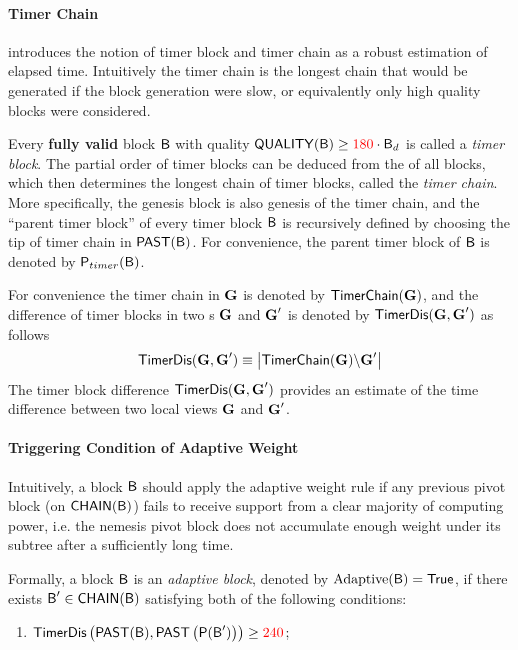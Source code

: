 {	\paragraph{Timer Chain}
	\label{sec:timer chain}

	\name introduces the notion of timer block and timer chain as a robust estimation of elapsed time.
	Intuitively the timer chain is the longest chain that would be generated if the block generation were slow, or equivalently only high quality blocks were considered.

	Every \textbf{fully valid} block $\textsf{B}$ with quality $\mathsf{QUALITY}(\textsf{B})\ge {\color{red}180}\cdot \textsf{B}_d$ is called a \emph{timer block}.
	The partial order of timer blocks can be deduced from the \tg of all blocks,
	which then determines the longest chain of timer blocks, called the \emph{timer chain}.	
	More specifically, the genesis block is also genesis of the timer chain, and the ``parent timer block'' of every timer block $\textsf{B}$ is recursively defined by choosing the tip of timer chain in $\mathsf{PAST}(\textsf{B})$. 
	For convenience, the parent timer block of $\textsf{B}$ is denoted by $\mathsf{P}_{timer}(\textsf{B})$.

	For convenience the timer chain in \tg $\textbf{G}$ is denoted by $\mathsf{TimerChain}(\textbf{G})$,
	and the difference of timer blocks in two {\tg}s $\textbf{G}$ and $\textbf{G}'$ is denoted by $\mathsf{TimerDis}(\textbf{G},\textbf{G}')$ as follows
	\begin{align}\label{def:timerdis}
		\mathsf{TimerDis}(\textbf{G},\textbf{G}') \equiv \left|\mathsf{TimerChain}(\textbf{G}) 
		\backslash  \textbf{G}' \right|
	\end{align}
	The timer block difference $\mathsf{TimerDis}(\textbf{G},\textbf{G}')$ provides an estimate of the time difference between two local views $\textbf{G}$ and $\textbf{G}'$.




	\paragraph{Triggering Condition of Adaptive Weight}
		

	Intuitively, a block $\textsf{B}$ should apply the adaptive weight rule if any previous pivot block (on $\mathsf{CHAIN}(\textsf{B})$) fails to 
	receive support from a clear majority of computing power,
	i.e. the nemesis pivot block does not accumulate enough weight under its subtree after a sufficiently long time.
	
	Formally, 
	a block $\textsf{B}$ is an \emph{adaptive block}, denoted by $\mathrm{Adaptive}(\textsf{B})=\mathsf{True}$,
	if there exists $\textsf{B}'\in\mathsf{CHAIN}(\textsf{B})$ satisfying both of the following conditions:
	\begin{enumerate}[]
		\item $\mathsf{TimerDis}\left(\mathsf{PAST}(\textsf{B}),\mathsf{PAST}\left(\mathsf{P}(\textsf{B}')\right) \right)\ge {\color{red}240}$;


\end{enumerate}}
